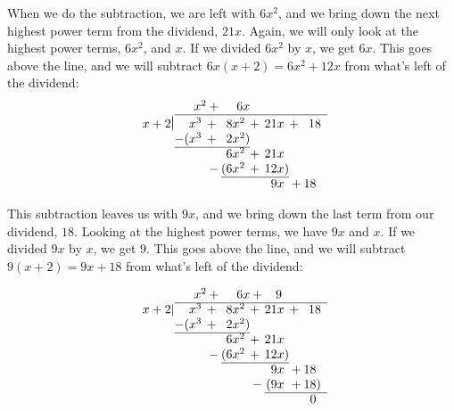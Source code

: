 {\noindent
When we do the subtraction, we are left with $6x^2$, and we bring down the next highest power term from the dividend, $21x$. Again, we will only look at the highest power terms, $6x^2$, and $x$. If we divided $6x^2$ by $x$, we get $6x$. This goes above the line, and we will subtract $6x(x+2)=6x^2+12x$ from what's left of the dividend:
\drawexampleline
\begin{equation*}
\begin{array}{r@{}r@{}c@{}r@{}c@{}r@{}c@{}r}
& x^2 & + & 6x &  &  \phantom{x}& & \\ \cline{2-8}
 \vert & & & & & & & \\[-10pt]
x+2  \vert & x^3 \phantom{)}& + \phantom{)} & 8x^2 \phantom{)}& + \phantom{)} & 21x \phantom{)}& + \phantom{)} & 18\\
& -(x^3 \phantom{)} & + \phantom{)} & 2x^2) & & & & \\ \cline{2-4}
 & & & 6x^2 \phantom{)} & + \phantom{)} & 21x \phantom{)} & & \\
 & & - & (6x^2 \phantom{)} & + \phantom{)} & 12x) & & \\ \cline{4-6}
 & & & & & 9x \phantom{)} & + & 18 \phantom{)} \\ 
 \end{array}
\end{equation*}

\noindent
This subtraction leaves us with $9x$, and we bring down the last term from our dividend, $18$. Looking at the highest power terms, we have $9x$ and $x$. If we divided $9x$ by $x$, we get $9$. This goes above the line, and we will subtract $9(x+2)=9x+18$ from what's left of the dividend:


\begin{equation*}
\begin{array}{r@{}r@{}c@{}r@{}c@{}r@{}c@{}r}
& x^2 & + & 6x & + & 9 \phantom{x}& & \\ \cline{2-8}
x+2  \vert & x^3 \phantom{)}& + \phantom{)} & 8x^2 \phantom{)}& + \phantom{)} & 21x \phantom{)}& + \phantom{)} & 18\\
& -(x^3 \phantom{)} & + \phantom{)} & 2x^2) & & & & \\ \cline{2-4}
 & & & 6x^2 \phantom{)} & + \phantom{)} & 21x \phantom{)} & & \\
 & & - & (6x^2 \phantom{)} & + \phantom{)} & 12x) & & \\ \cline{4-6}
 & & & & & 9x \phantom{)} & + & 18 \phantom{)} \\ 
 & & & & - & (9x \phantom{)} & + & 18) \\  \cline{6-8}
 & & & &  & & & 0 \phantom{)}
\end{array}
\end{equation*}

}
